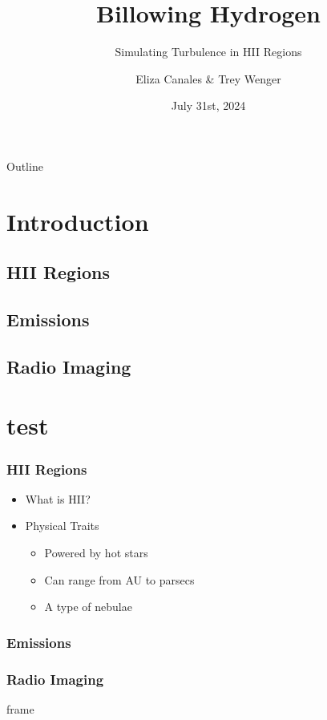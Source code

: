 \documentclass{beamer}
\title{Billowing Hydrogen}
\subtitle{Simulating Turbulence in HII Regions}
\author{Eliza Canales \& Trey Wenger}
\institute[UW-Madison \& NRAO]{University of Wisconsin -- Madison \& National Radio Astronomy Observatory}
\date{July 31st, 2024}
\begin{document}
\begin{frame}
  \titlepage
\end{frame}

\begin{frame}{Outline}
  \tableofcontents
\end{frame}
\section{Introduction}
\subsection{HII Regions}
\subsection{Emissions}
\subsection{Radio Imaging}
\section{test}

\begin{frame}
  \frametitle{HII Regions}
  \begin{itemize}
    \item What is HII?
    \item Physical Traits
      \begin{itemize}
        \item Powered by hot stars
        \item Can range from AU to parsecs
        \item A type of nebulae
      \end{itemize}
  \end{itemize}
\end{frame}

\begin{frame}
  \frametitle{Emissions}
\end{frame}

\begin{frame}
  \frametitle{Radio Imaging}
\end{frame}

\begin{frame}
  frame
\end{frame}
\end{document}
